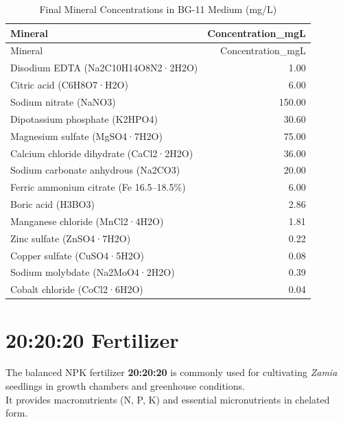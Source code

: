 \documentclass[
  11pt,
]{article}
\begin{document}
\begin{longtable}[]{@{}lr@{}}
\caption{Final Mineral Concentrations in BG-11 Medium
(mg/L)}\tabularnewline
\toprule\noalign{}
Mineral & Concentration\_mgL \\
\midrule\noalign{}
\endfirsthead
\toprule\noalign{}
Mineral & Concentration\_mgL \\
\midrule\noalign{}
\endhead
\bottomrule\noalign{}
\endlastfoot
Disodium EDTA (Na2C10H14O8N2·2H2O) & 1.00 \\
Citric acid (C6H8O7·H2O) & 6.00 \\
Sodium nitrate (NaNO3) & 150.00 \\
Dipotassium phosphate (K2HPO4) & 30.60 \\
Magnesium sulfate (MgSO4·7H2O) & 75.00 \\
Calcium chloride dihydrate (CaCl2·2H2O) & 36.00 \\
Sodium carbonate anhydrous (Na2CO3) & 20.00 \\
Ferric ammonium citrate (Fe 16.5--18.5\%) & 6.00 \\
Boric acid (H3BO3) & 2.86 \\
Manganese chloride (MnCl2·4H2O) & 1.81 \\
Zinc sulfate (ZnSO4·7H2O) & 0.22 \\
Copper sulfate (CuSO4·5H2O) & 0.08 \\
Sodium molybdate (Na2MoO4·2H2O) & 0.39 \\
Cobalt chloride (CoCl2·6H2O) & 0.04 \\
\end{longtable}

\section{20:20:20 Fertilizer}\label{fertilizer}

The balanced NPK fertilizer \textbf{20:20:20} is commonly used for
cultivating \emph{Zamia} seedlings in growth chambers and greenhouse
conditions.\\
It provides macronutrients (N, P, K) and essential micronutrients in
chelated form.
\end{document}

